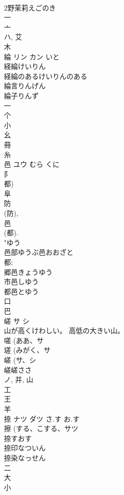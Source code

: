\documentclass[8pt]{extreport}
\begin{document}
\begin{CJK}{UTF8}{min}
\\	2野茉莉えごのき
\\	一 
\\	亠 
\\	ハ, 艾 
\\	木 
\\	綸	リン カン	いと	
\\	経綸けいりん
\\	経綸のあるけいりんのある
\\	綸言りんげん
\\	綸子りんず
\\	一 
\\	个 
\\	小 
\\	幺 
\\	冊 
\\	糸 
\\	邑	ユウ	むら くに	
\\	阝 
\\	都) 
\\	阜 
\\	防 
\\	(防), 
\\	邑 
\\	(都).
\\	"ゆう
\\	邑部ゆうぶ邑おおざと
\\	都; 
\\	郷邑きょうゆう
\\	市邑しゆう
\\	都邑とゆう
\\	口 
\\	巴 
\\	嵯	サ シ		
\\	山が高くけわしい。 高低の大きい山。 
\\	嗟 (ああ、サ 
\\	瑳 (みがく、サ 
\\	嵯 (サ、シ 
\\	嵯嵯ささ
\\	ノ, 并, 山 
\\	工 
\\	王 
\\	羊 
\\	捺	ナツ ダツ	さ.す お.す	
\\	擦 (する、こする、サツ 
\\	捺すおす 
\\	捺印なついん 
\\	捺染なっせん 
\\	二 
\\	大 
\\	小 

\end{CJK}
\end{document}
